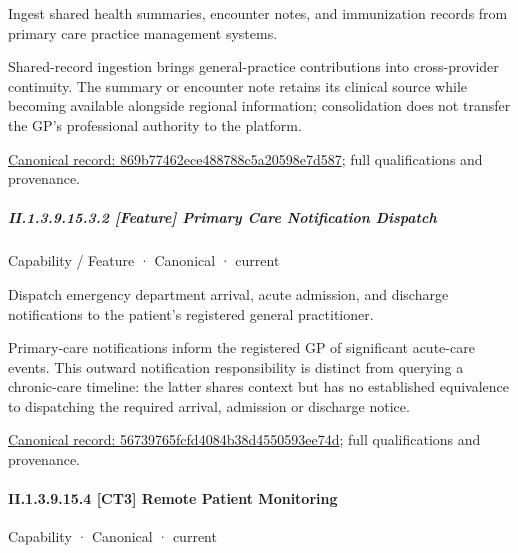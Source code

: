 Ingest shared health summaries, encounter notes, and immunization records from primary care practice management systems.



Shared-record ingestion brings general-practice contributions into cross-provider continuity. The summary or encounter note retains its clinical source while becoming available alongside regional information; consolidation does not transfer the GP's professional authority to the platform.


{\footnotesize \href{../../../../continuum/strategy/capability/feature/869b77462ece488788c5a20598e7d587.md}{Canonical record: 869b77462ece488788c5a20598e7d587}; full qualifications and provenance.}\par
\subparagraph*{II.1.3.9.15.3.2 [Feature] Primary Care Notification Dispatch}
\label{navigation:II.1.3.9.15.3.2}

\label{element:56739765fcfd4084b38d4550593ee74d}
{\small Capability / Feature · Canonical · current}\par

Dispatch emergency department arrival, acute admission, and discharge notifications to the patient's registered general practitioner.



Primary-care notifications inform the registered GP of significant acute-care events. This outward notification responsibility is distinct from querying a chronic-care timeline: the latter shares context but has no established equivalence to dispatching the required arrival, admission or discharge notice.


{\footnotesize \href{../../../../continuum/strategy/capability/feature/56739765fcfd4084b38d4550593ee74d.md}{Canonical record: 56739765fcfd4084b38d4550593ee74d}; full qualifications and provenance.}\par
\paragraph*{II.1.3.9.15.4 [CT3] Remote Patient Monitoring}
\label{navigation:II.1.3.9.15.4}

\label{element:2d1addc7dd1d4821b71a11c692d35b27}
{\small Capability · Canonical · current}\par

